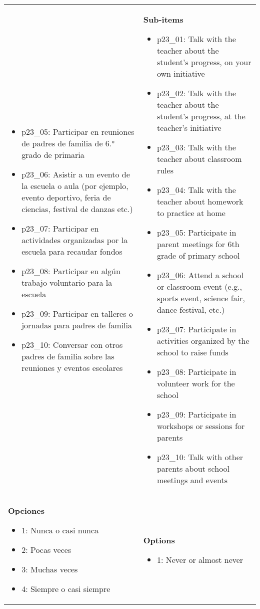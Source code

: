 \documentclass[11pt]{article}
\begin{document}
\begin{longtable}{@{}LL@{}}
\begin{itemize}[leftmargin=*]
\item p23\_05: Participar en reuniones de padres de familia de 6.° grado de primaria
\item p23\_06: Asistir a un evento de la escuela o aula (por ejemplo, evento deportivo, feria de ciencias, festival de danzas etc.)
\item p23\_07: Participar en actividades organizadas por la escuela para recaudar fondos
\item p23\_08: Participar en algún trabajo voluntario para la escuela
\item p23\_09: Participar en talleres o jornadas para padres de familia
\item p23\_10: Conversar con otros padres de familia sobre las reuniones y eventos escolares\end{itemize} & \textbf{Sub-items}\par\begin{itemize}[leftmargin=*]\item p23\_01: Talk with the teacher about the student's progress, on your own initiative
\item p23\_02: Talk with the teacher about the student's progress, at the teacher's initiative
\item p23\_03: Talk with the teacher about classroom rules
\item p23\_04: Talk with the teacher about homework to practice at home
\item p23\_05: Participate in parent meetings for 6th grade of primary school
\item p23\_06: Attend a school or classroom event (e.g., sports event, science fair, dance festival, etc.)
\item p23\_07: Participate in activities organized by the school to raise funds
\item p23\_08: Participate in volunteer work for the school
\item p23\_09: Participate in workshops or sessions for parents
\item p23\_10: Talk with other parents about school meetings and events\end{itemize} \\
\textbf{Opciones}\par\begin{itemize}[leftmargin=*]\item 1: Nunca o casi nunca
\item 2: Pocas veces
\item 3: Muchas veces
\item 4: Siempre o casi siempre\end{itemize} & \textbf{Options}\par\begin{itemize}[leftmargin=*]\item 1: Never or almost never

\end{itemize}
\end{longtable}
\end{document}
